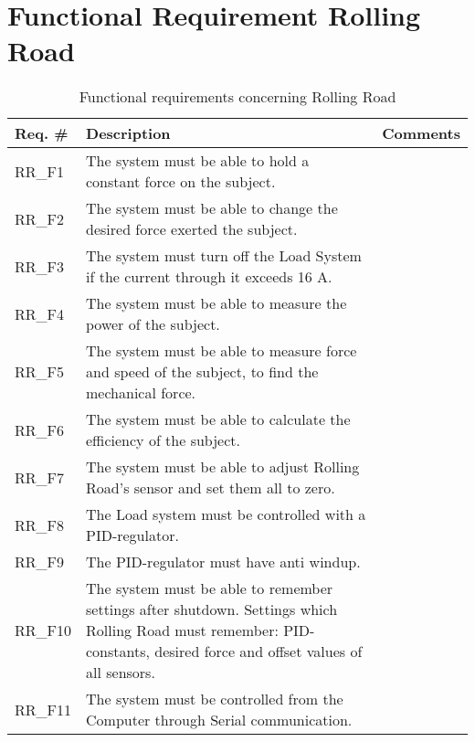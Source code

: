 \section{Functional Requirement Rolling Road}

\begin{table}[h!]
	\label{FREQ_AU2}
	\centering
	\begin{tabular}{|p{2 cm}|p{10 cm}|p{2 cm}|}
		\hline
		\textbf{Req. \#} & \textbf{Description} & \textbf{Comments} \\\hline
		RR\_F1
		& The system must be able to hold a constant force on the subject.
		&  \\ \hline
		RR\_F2
		& The system must be able to change the desired force exerted the subject. 
		&  \\ \hline
		RR\_F3
		& The system must turn off the Load System if the current through it exceeds 16 A.
		&  \\ \hline
		RR\_F4
		& The system must be able to measure the power of the subject.
		&  \\ \hline
		RR\_F5
		& The system must be able to measure force and speed of the subject, to find the mechanical force.
		&  \\ \hline
		RR\_F6
		& The system must be able to calculate the efficiency of the subject. 
		&  \\ \hline
		RR\_F7
		& The system must be able to adjust Rolling Road's sensor and set them all to zero. 
		&  \\ \hline
		RR\_F8
		& The Load system must be controlled with a PID-regulator.
		&  \\ \hline
		RR\_F9
		& The PID-regulator must have anti windup.
		&  \\ \hline
		RR\_F10
		& The system must be able to remember settings after shutdown. Settings which Rolling Road must remember: PID-constants, desired force and offset values of all sensors.
		&  \\ \hline
		RR\_F11
		& The system must be controlled from the Computer through Serial communication.  
		&  \\ \hline
	\end{tabular}
	\caption{Functional requirements concerning Rolling Road}
\end{table}
